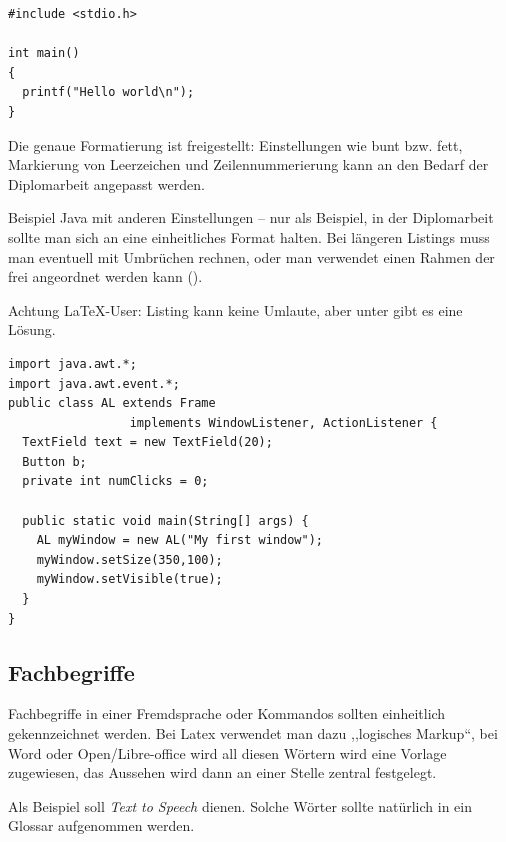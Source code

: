 \documentclass[a4paper,ngerman,naustrian,DIV=12,BCOR=1cm]{scrbook}
\begin{document}
\begin{lstlisting}
#include <stdio.h>

int main()
{
  printf("Hello world\n");
}
\end{lstlisting}

Die genaue Formatierung ist freigestellt: Einstellungen wie bunt bzw.
fett, Markierung von Leerzeichen und Zeilennummerierung kann an den
Bedarf der Diplomarbeit angepasst werden.

Beispiel Java mit anderen Einstellungen -- nur als Beispiel, in der
Diplomarbeit sollte man sich an eine einheitliches Format halten.
Bei längeren Listings muss man eventuell mit Umbrüchen rechnen, oder
man verwendet einen Rahmen der frei angeordnet werden kann ().

\lstset{numbers=right, numberstyle=\tiny, stepnumber=2, numbersep=5pt, showspaces=false, frame=single}
\lstset{language=Java}

Achtung \LaTeX{}-User: Listing kann keine Umlaute, aber unter \cite{listingtipp}
gibt es eine Lösung.

\begin{lstlisting}[caption={Java Beispiel},captionpos=b]
import java.awt.*;
import java.awt.event.*;
public class AL extends Frame
                 implements WindowListener, ActionListener {
  TextField text = new TextField(20);
  Button b;
  private int numClicks = 0;

  public static void main(String[] args) {
    AL myWindow = new AL("My first window");
    myWindow.setSize(350,100);
    myWindow.setVisible(true);
  }
}
\end{lstlisting}


\subsection{Fachbegriffe}

Fachbegriffe in einer Fremdsprache oder Kommandos sollten einheitlich
gekennzeichnet werden. Bei Latex verwendet man dazu ,,logisches Markup``,
bei Word oder Open/Libre-office wird all diesen Wörtern wird eine
Vorlage zugewiesen, das Aussehen wird dann an einer Stelle zentral
festgelegt.

Als Beispiel soll \emph{Text to Speech}
dienen. Solche Wörter sollte natürlich in ein Glossar aufgenommen
werden.
\end{document}
